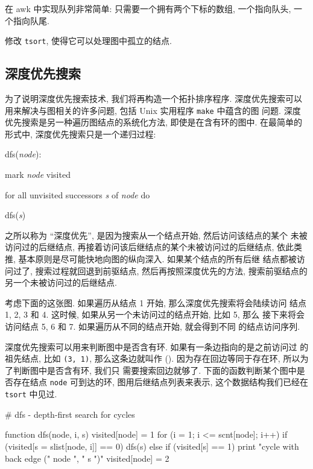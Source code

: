 在 awk 中实现队列非常简单: 只需要一个拥有两个下标的数组, 一个指向队头, 
一个指向队尾.

\begin{exercise}
    修改 \texttt{tsort}, 使得它可以处理图中孤立的结点.
\end{exercise}

\subsection{深度优先搜索}
\label{subsec:depth_first_search}

为了说明深度优先搜索技术, 我们将再构造一个拓扑排序程序. 深度优先搜索可以
用来解决与图相关的许多问题, 包括 Unix 实用程序 \texttt{make} 中蕴含的图
问题. 深度优先搜索是另一种遍历图结点的系统化方法, 即使是在含有环的图中.
在最简单的形式中, 深度优先搜索只是一个递归过程:
\begin{pattern}
    \indent dfs(\textit{node}): \par
    \indent\indent mark \textit{node} visited \par
    \indent\indent for all unvisited successors \textit{s} of \textit{node}
                do \par
    \indent\indent\indent dfs(\textit{s})
\end{pattern}
之所以称为 ``深度优先'', 是因为搜索从一个结点开始, 然后访问该结点的某个
未被访问过的后继结点, 再接着访问该后继结点的某个未被访问过的后继结点,
依此类推, 基本原则是尽可能快地向图的纵向深入. 如果某个结点的所有后继
结点都被访问过了, 搜索过程就回退到前驱结点, 然后再按照深度优先的方法,
搜索前驱结点的另一个未被访问过的后继结点.

考虑下面的这张图. 如果遍历从结点 1 开始, 那么深度优先搜索将会陆续访问
结点 1, 2, 3 和 4. 这时候, 如果从另一个未访问过的结点开始, 比如 5, 那么 
接下来将会访问结点 5, 6 和 7. 如果遍历从不同的结点开始, 就会得到不同
的结点访问序列.
\begin{center}
\end{center}

深度优先搜索可以用来判断图中是否含有环. 如果有一条边指向的是之前访问过
的祖先结点, 比如 \texttt{(3, 1)}, 那么这条边就叫作 (). 因为存在回边等同于存在环, 所以为了判断图中是否含有环, 我们只 
需要搜索回边就够了. 下面的函数判断某个图中是否存在结点 \texttt{node} 
可到达的环, 图用后继结点列表来表示, 这个数据结构我们已经在 \texttt{tsort}
中见过.
\begin{awkcode}
    # dfs - depth-first search for cycles

    function dfs(node,     i, s) {
        visited[node] = 1
        for (i = 1; i <= scnt[node]; i++)
            if (visited[s = slist[node, i]] == 0)
                dfs(s)
            else if (visited[s] == 1)
                print "cycle with back edge (" node ", " s ")" 
        visited[node] = 2
    }
\end{awkcode}

